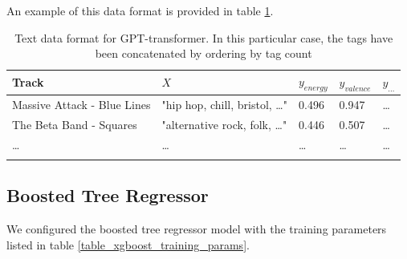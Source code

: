\documentclass[sn-mathphys]{sn-jnl}%
\theoremstyle{thmstyleone}%
\theoremstyle{thmstyletwo}%
\theoremstyle{thmstylethree}%
\begin{document}
An example of this data format is provided in table \ref{text_format}.

\begin{table}[h]
      \begin{center}
      \begin{minipage}{\textwidth}
      \caption{Text data format for GPT-transformer. In this particular case, the tags have been concatenated by ordering by tag count}\label{text_format}%
      \begin{tabular}{@{}lllll@{}}
      \toprule
      Track                         & $X$                                   & $y_{energy}$ & $y_{valence}$ & $y_{\dots}$ \\
      \midrule
      Massive Attack - Blue Lines   & "hip hop, chill, bristol, \dots"      & 0.496        & 0.947         & \dots  \\
      The Beta Band - Squares       & "alternative rock, folk, \dots"       & 0.446        & 0.507         & \dots \\
      \dots                         & \dots                                 & \dots        & \dots         & \dots  \\
      \botrule
      \end{tabular}
      \end{minipage}
      \end{center}
\end{table}




\subsection{Boosted Tree Regressor}

We configured the boosted tree regressor model with the training parameters listed in table \ref{table_xgboost_training_params}.
\end{document}
